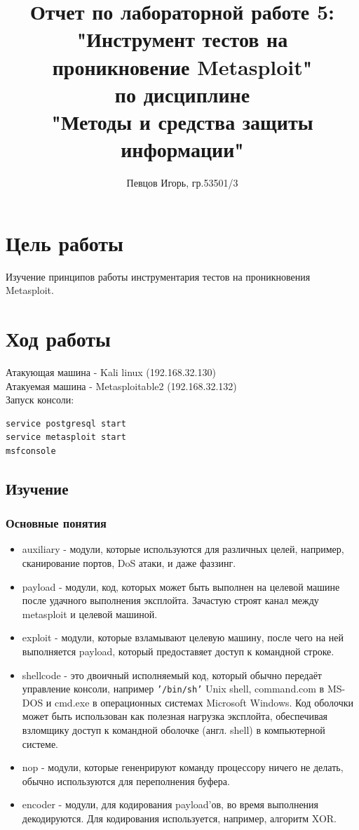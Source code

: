 \documentclass[a4paper, 14pt]{article}				%
\author{Певцов Игорь, гр.53501/3}
\title{Отчет по лабораторной работе 5:\\"Инструмент тестов на проникновение Metasploit"\\ по дисциплине\\"Методы и средства защиты информации"}
\begin{document}
\maketitle

\newpage
\tableofcontents{}

\newpage
\section{Цель работы}
Изучение принципов работы инструментария тестов на проникновения Metasploit.
\section{Ход работы}
Атакующая машина - Kali linux (192.168.32.130)\\
Атакуемая машина - Metasploitable2 (192.168.32.132)\\
Запуск консоли:
\begin{Verbatim}[frame=single]
service postgresql start
service metasploit start
msfconsole
\end{Verbatim}

\subsection{Изучение}
\subsubsection{Основные понятия}
\begin{itemize}
\item auxiliary - модули, которые используются для различных целей, например, сканирование портов, DoS атаки, и даже фаззинг.
\item payload - модули, код, которых может быть выполнен на целевой машине после удачного выполнения эксплойта. Зачастую строят канал между metasploit и целевой машиной.
\item exploit - модули, которые взламывают целевую машину, после чего на ней выполняется payload, который предоставяет доступ к командной строке.
\item shellcode - это двоичный исполняемый код, который обычно передаёт управление консоли, например \verb'’/bin/sh’' Unix shell, command.com в MS-DOS и cmd.exe в операционных системах Microsoft Windows. Код оболочки может быть использован как полезная нагрузка эксплойта, обеспечивая взломщику доступ к командной оболочке (англ. shell) в компьютерной системе.
\item nop - модули, которые гененрируют команду процессору ничего не делать, обычно используются для переполнения буфера.
\item encoder - модули, для кодирования payload'ов, во время выполнения декодируются. Для кодирования используется, например, алгоритм XOR. 
\end{itemize}
\end{document}
